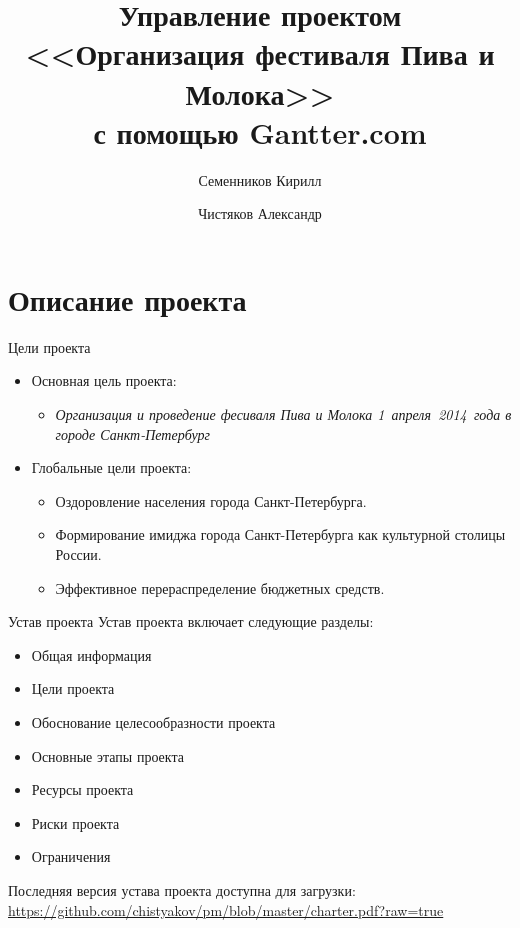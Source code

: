 \documentclass[10pt,pdf,hyperref=unicode,hyperref={bookmarks=false}]{beamer}
\title[Организация фестиваля Пива и Молока]{Управление проектом\\ <<Организация фестиваля Пива и Молока>>\\ с помощью Gantter.com}
\author{Семенников Кирилл\and Чистяков Александр}
\institute{Санкт-Петербургский национальный исследовательский университет информационных технологий, механики и оптики}
\begin{document}
  \begin{frame}
    \maketitle
  \end{frame}
  \section{Описание проекта}
    \begin{frame}{Цели проекта}
      \begin{itemize}
        \item Основная цель проекта:
          \begin{itemize}
            \item \emph{Организация и проведение фесиваля Пива и Молока 1~апреля~2014~года в городе Санкт-Петербург}
          \end{itemize}
        \item Глобальные цели проекта:
          \begin{itemize}
            \item{Оздоровление населения города Санкт-Петербурга.}
            \item{Формирование имиджа города Санкт-Петербурга как культурной столицы России.}
            \item{Эффективное перераспределение бюджетных средств.}
          \end{itemize}
      \end{itemize}
    \end{frame} 
    \begin{frame}{Устав проекта}
      Устав проекта включает следующие разделы:
      \begin{itemize}
        \item Общая информация
        \item Цели проекта
        \item Обоснование целесообразности проекта
        \item Основные этапы проекта
        \item Ресурсы проекта
        \item Риски проекта
        \item Ограничения
      \end{itemize}

      Последняя версия устава проекта доступна для загрузки:\\
      \href{https://github.com/chistyakov/pm/blob/master/charter.pdf?raw=true}{https://github.com/chistyakov/pm/blob/master/charter.pdf?raw=true}
    \end{frame}
\end{document}
